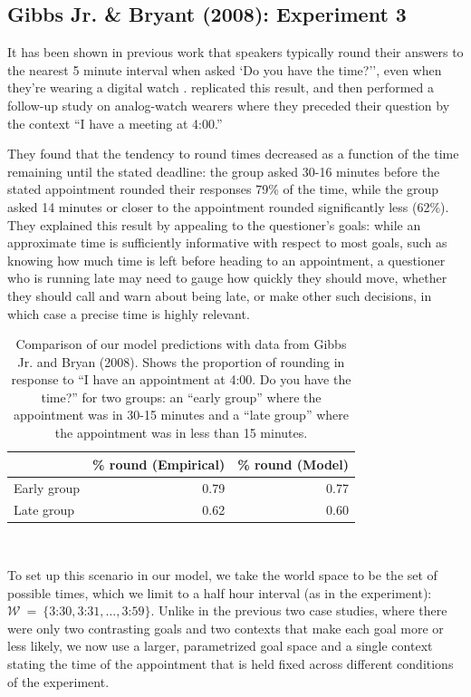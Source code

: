 \documentclass[12pt, floatsintext, jou]{apa6}
\begin{document}
\subsection{Gibbs Jr. \& Bryant (2008): Experiment 3}

It has been shown in previous work that speakers typically round their answers to the nearest 5 minute interval when asked `Do you have the time?'', even when they're wearing a digital watch \cite{DerHenstCarlesSperber02_RelevanceTellingTime}.   replicated this result, and then performed a follow-up study on analog-watch wearers where they preceded their question by the context ``I have a meeting at 4:00.'' 

They found that the tendency to round times decreased as a function of the time remaining until the stated deadline: the group asked 30-16 minutes before the stated appointment rounded their responses 79\% of the time, while the group asked 14 minutes or closer to the appointment rounded significantly less (62\%). They explained this result by appealing to the questioner's goals: while an approximate time is sufficiently informative with respect to most goals, such as knowing how much time is left before heading to an appointment, a questioner who is running late may need to gauge how quickly they should move, whether they should call and warn about being late, or make other such decisions, in which case a precise time is highly relevant. 
\begin{table}[t]
\centering
\begin{tabular}{ p{2cm} | r |||||| r }
&  \% round (Empirical) &  \% round (Model) \\
\hline
Early group &  0.79 & 0.77 \\
\hline
Late group     &0.62  & 0.60 \\
\end{tabular}
\\[1.5pt]
\caption{Comparison of our model predictions with data from Gibbs Jr. and Bryan (2008). Shows the proportion of rounding in response to ``I have an appointment at 4:00. Do you have the time?'' for two groups: an ``early group'' where the appointment was in 30-15 minutes and a ``late group'' where the appointment was in less than 15 minutes.} 
\label{table:gibbsJrExp3}
\end{table}

To set up this scenario in our model, we take the world space to be the set of possible times, which we limit to a half hour interval (as in the experiment): $\mathcal{W}~=~\{\textrm{3:30}, \textrm{3:31}, \dots, \textrm{3:59}\}$. Unlike in the previous two case studies, where there were only two contrasting goals and two contexts that make each goal more or less likely, we now use a larger, parametrized goal space and a single context stating the time of the appointment that is held fixed across different conditions of the experiment. 
\end{document}
